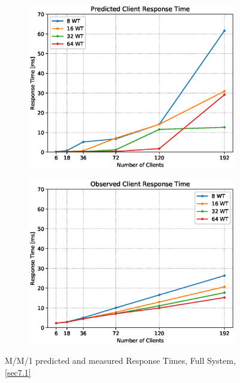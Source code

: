 \documentclass[11pt,a4paper]{article}
\begin{document}
\begin{figure}
    \begin{subfigure}{.5\textwidth}
        \includegraphics[width=1\linewidth]{plots/7_MM1_ResponseTimePredicted.eps}
    \end{subfigure}
    \begin{subfigure}{.5\textwidth}
        \includegraphics[width=1\linewidth]{plots/7_MM1_ResponseTimeObserved.eps}
    \end{subfigure}
    \caption{M/M/1 predicted and measured Response Times, Full System, \autoref{sec7.1}}
    \label{fig:mm1-RT}
\end{figure}
\end{document}
